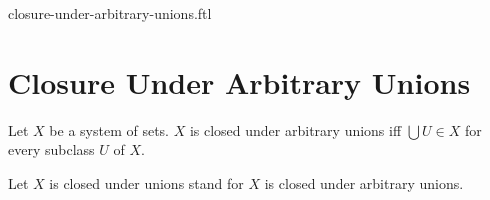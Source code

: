 \documentclass{naproche-library}
\begin{document}
\begin{smodule}{closure-under-arbitrary-unions.ftl}

  \section*{Closure Under Arbitrary Unions}

  \begin{definition}[forthel,id=FOUNDATIONS_14_3959378992431104]
    Let $X$ be a system of sets.
    $X$ is closed under arbitrary unions iff $\bigcup U \in X$ for every  subclass $U$ of $X$.

    Let $X$ is closed under unions stand for $X$ is closed under arbitrary unions.
  \end{definition}
\end{smodule}
\end{document}
